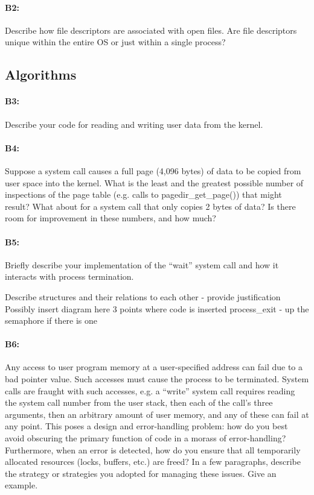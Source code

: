 \paragraph{B2:} %
Describe how file descriptors are associated with open files. Are file descriptors unique within the entire OS or just within a single process?

\subsection{Algorithms}
\paragraph{B3:} %
Describe your code for reading and writing user data from the kernel.

\paragraph{B4:} %
Suppose a system call causes a full page (4,096 bytes) of data to be copied from user space into the kernel.  What is the least and the greatest possible number of inspections of the page table (e.g. calls to pagedir\_get\_page()) that might result?  What about for a system call that only copies 2 bytes of data?  Is there room for improvement in these numbers, and how much?

\paragraph{B5:} %
Briefly describe your implementation of the ``wait'' system call and how it interacts with process termination.

Describe structures and their relations to each other - provide justification
	Possibly insert diagram here
3 points where code is inserted
	process_exit - up the semaphore if there is one

\paragraph{B6:} %
Any access to user program memory at a user-specified address can fail due to a bad pointer value.  Such accesses must cause the process to be terminated.  System calls are fraught with such accesses, e.g. a ``write'' system call requires reading the system call number from the user stack, then each of the call's three arguments, then an arbitrary amount of user memory, and any of these can fail at any point.  This poses a design and error-handling problem: how do you best avoid obscuring the primary function of code in a morass of error-handling?  Furthermore, when an error is detected, how do you ensure that all temporarily allocated resources (locks, buffers, etc.) are freed?  In a few paragraphs, describe the strategy or strategies you adopted for managing these issues.  Give an example.

